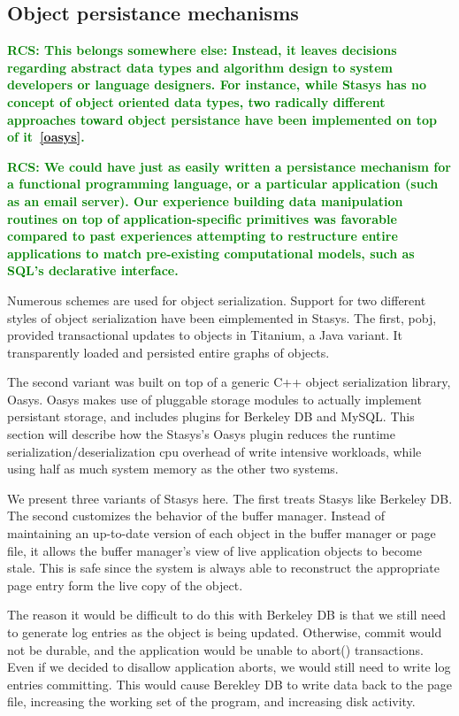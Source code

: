\documentclass[letterpaper,twocolumn,10pt]{article}
\newcommand{\yad}{Stasys\xspace}
\newcommand{\oasys}{Oasys\xspace}
\newcommand{\rcs}[1]{\textcolor{green}{\bf RCS: #1}}
\begin{document}
\subsection{Object persistance mechanisms}
\rcs{ This belongs somewhere else: Instead, it leaves decisions regarding abstract data types and
algorithm design to system developers or language designers.  For
instance, while \yad has no concept of object oriented data types, two
radically different approaches toward object persistance have been
implemented on top of it~\ref{oasys}.}

\rcs{We could have just as easily written a persistance mechanism for a
functional programming language, or a particular application (such as
an email server).  Our experience building data manipulation routines
on top of application-specific primitives was favorable compared to
past experiences attempting to restructure entire applications to
match pre-existing computational models, such as SQL's declarative
interface.}




Numerous schemes are used for object serialization.  Support for two
different styles of object serialization have been eimplemented in
\yad.  The first, pobj, provided transactional updates to objects in
Titanium, a Java variant.  It transparently loaded and persisted
entire graphs of objects.

The second variant was built on top of a generic C++ object
serialization library, \oasys.  \oasys makes use of pluggable storage
modules to actually implement persistant storage, and includes plugins
for Berkeley DB and MySQL.  This section will describe how the \yad's
\oasys plugin reduces the runtime serialization/deserialization cpu
overhead of write intensive workloads, while using half as much system
memory as the other two systems.

We present three variants of \yad here.  The first treats \yad like
Berkeley DB.  The second customizes the behavior of the buffer
manager.  Instead of maintaining an up-to-date version of each object
in the buffer manager or page file, it allows the buffer manager's
view of live application objects to become stale.  This is safe since
the system is always able to reconstruct the appropriate page entry
form the live copy of the object.

The reason it would be difficult to do this with Berkeley DB is that
we still need to generate log entries as the object is being updated.
Otherwise, commit would not be durable, and the application would be
unable to abort() transactions.  Even if we decided to disallow
application aborts, we would still need to write log entries
committing.  This would cause Berekley DB to write data back to the
page file, increasing the working set of the program, and increasing
disk activity.
\end{document}
